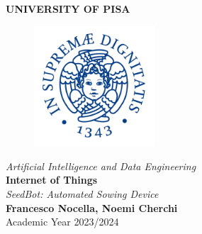\begin{titlepage}
    \centering
    \vspace*{\fill}
    {\LARGE \textbf{UNIVERSITY OF PISA}}\\[0.5cm]
    \begin{figure}[h]
        \centering
        \includegraphics[width=0.4\textwidth]{media/university-of-Pisa-logo.jpg}
    \end{figure}
    {\Large \textit{Artificial Intelligence and Data Engineering}}\\[1.5cm]
    {\LARGE \textbf{Internet of Things}}\\[1cm]
    {\Large \textit{SeedBot: Automated Sowing Device}}\\[2cm]
    
    {\large \textbf{Francesco Nocella, Noemi Cherchi}}\\[0.5cm]
    {\large Academic Year 2023/2024}
    \vspace*{\fill}
\end{titlepage}